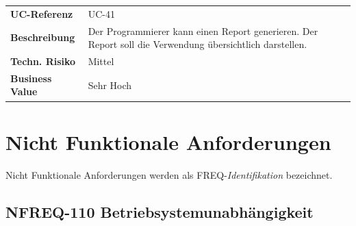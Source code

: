 \begin{longtable}[c]{@{}ll@{}}
\toprule
\begin{minipage}[t]{0.20\columnwidth}\raggedright\strut
\textbf{UC-Referenz}
\strut\end{minipage} &
\begin{minipage}[t]{0.74\columnwidth}\raggedright\strut
UC-41
\strut\end{minipage}\tabularnewline
\begin{minipage}[t]{0.20\columnwidth}\raggedright\strut
\textbf{Beschreibung}
\strut\end{minipage} &
\begin{minipage}[t]{0.74\columnwidth}\raggedright\strut
Der Programmierer kann einen Report generieren. Der Report soll die
Verwendung übersichtlich darstellen.
\strut\end{minipage}\tabularnewline
\begin{minipage}[t]{0.20\columnwidth}\raggedright\strut
\textbf{Techn. Risiko}
\strut\end{minipage} &
\begin{minipage}[t]{0.74\columnwidth}\raggedright\strut
Mittel
\strut\end{minipage}\tabularnewline
\begin{minipage}[t]{0.20\columnwidth}\raggedright\strut
\textbf{Business Value}
\strut\end{minipage} &
\begin{minipage}[t]{0.74\columnwidth}\raggedright\strut
Sehr Hoch
\strut\end{minipage}\tabularnewline
\bottomrule
\end{longtable}

\newpage

\section{Nicht Funktionale
Anforderungen}\label{nicht-funktionale-anforderungen}

Nicht Funktionale Anforderungen werden als FREQ-\emph{Identifikation}
bezeichnet.

\subsection{NFREQ-110
Betriebsystemunabhängigkeit}\label{nfreq-110-betriebsystemunabhuxe4ngigkeit}

